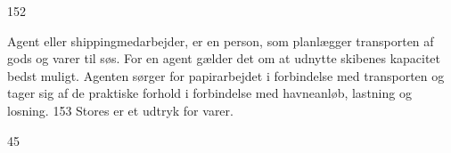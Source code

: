 152

Agent eller shippingmedarbejder, er en person, som planlægger
transporten af gods og varer til søs. For en agent gælder det om at
udnytte skibenes kapacitet bedst muligt. Agenten sørger for
papirarbejdet i forbindelse med transporten og tager sig af de praktiske
forhold i forbindelse med havneanløb, lastning og losning. 153 Stores er
et udtryk for varer.

45
